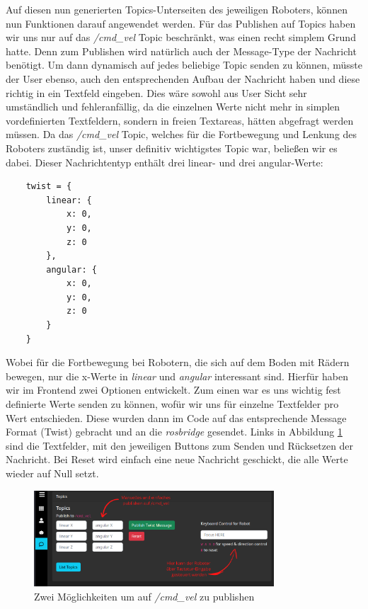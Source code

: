 \begin{flushleft}
Auf diesen nun generierten Topics-Unterseiten des jeweiligen Roboters, können nun Funktionen darauf angewendet werden.
Für das Publishen auf Topics haben wir uns nur auf das \textit{/cmd\_vel} Topic beschränkt, was einen recht simplem Grund hatte.
Denn zum Publishen wird natürlich auch der Message-Type der Nachricht benötigt.
Um dann dynamisch auf jedes beliebige Topic senden zu können, müsste der User ebenso, auch den entsprechenden Aufbau der Nachricht haben und diese richtig in ein Textfeld eingeben.
Dies wäre sowohl aus User Sicht sehr umständlich und fehleranfällig, da die einzelnen Werte nicht mehr in simplen vordefinierten Textfeldern, sondern in freien Textareas, hätten abgefragt werden müssen. 
Da das \textit{/cmd\_vel} Topic, welches für die Fortbewegung und Lenkung des Roboters zuständig ist, unser definitiv wichtigstes Topic war, beließen wir es dabei.
Dieser Nachrichtentyp enthält drei linear- und drei angular-Werte:
\begin{lstlisting}
    twist = {
        linear: {
            x: 0,
            y: 0,
            z: 0
        },
        angular: {
            x: 0,
            y: 0,
            z: 0
        }
    }
\end{lstlisting}
Wobei für die Fortbewegung bei Robotern, die sich auf dem Boden mit Rädern bewegen, nur die x-Werte in \textit{linear} und \textit{angular} interessant sind.
Hierfür haben wir im Frontend zwei Optionen entwickelt. 
Zum einen war es uns wichtig fest definierte Werte senden zu können, wofür wir uns für einzelne Textfelder pro Wert entschieden.
Diese wurden dann im Code auf das entsprechende Message Format (Twist) gebracht und an die \textit{rosbridge} gesendet.
Links in Abbildung \ref{fig:web_publish} sind die Textfelder, mit den jeweiligen Buttons zum Senden und Rücksetzen der Nachricht.
Bei Reset wird einfach eine neue Nachricht geschickt, die alle Werte wieder auf Null setzt.

\begin{figure}[h!]
    \centering
    \includegraphics[width=0.8\textwidth]{imgs/web/web_publish.png}
    \caption{Zwei Möglichkeiten um auf \textit{/cmd\_vel} zu publishen}
    \label{fig:web_publish}%
\end{figure}


\end{flushleft}
